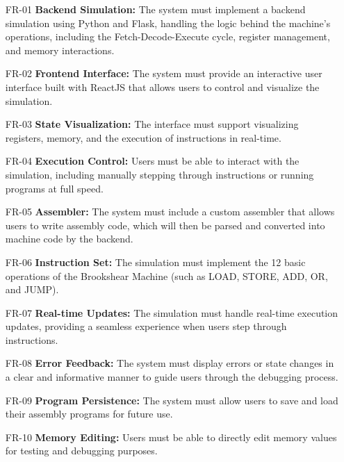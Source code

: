 \begin{enumerate}
    \item[FR-01] \textbf{Backend Simulation:} The system must implement a backend simulation using Python and Flask, handling the logic behind the machine's operations, including the Fetch-Decode-Execute cycle, register management, and memory interactions.
    
    \item[FR-02] \textbf{Frontend Interface:} The system must provide an interactive user interface built with ReactJS that allows users to control and visualize the simulation.
    
    \item[FR-03] \textbf{State Visualization:} The interface must support visualizing registers, memory, and the execution of instructions in real-time.
    
    \item[FR-04] \textbf{Execution Control:} Users must be able to interact with the simulation, including manually stepping through instructions or running programs at full speed.
    
    \item[FR-05] \textbf{Assembler:} The system must include a custom assembler that allows users to write assembly code, which will then be parsed and converted into machine code by the backend.
    
    \item[FR-06] \textbf{Instruction Set:} The simulation must implement the 12 basic operations of the Brookshear Machine (such as LOAD, STORE, ADD, OR, and JUMP).
    
    \item[FR-07] \textbf{Real-time Updates:} The simulation must handle real-time execution updates, providing a seamless experience when users step through instructions.
    
    \item[FR-08] \textbf{Error Feedback:} The system must display errors or state changes in a clear and informative manner to guide users through the debugging process.
    
    \item[FR-09] \textbf{Program Persistence:} The system must allow users to save and load their assembly programs for future use.
    
    \item[FR-10] \textbf{Memory Editing:} Users must be able to directly edit memory values for testing and debugging purposes.
    

\end{enumerate}
